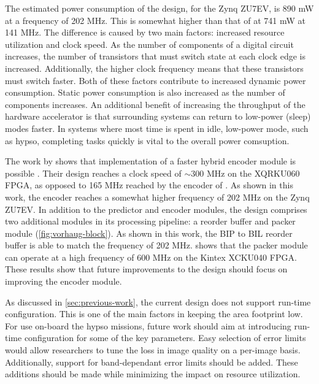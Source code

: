 The estimated power consumption of the design, for the Zynq ZU7EV, is 890 mW at a frequency of 202 MHz. This is somewhat higher than that of \citeauthor{vorhaugHyperspectralImageCompression2024} at 741 mW at 141 MHz. The difference is caused by two main factors: increased resource utilization and clock speed. As the number of components of a digital circuit increases, the number of transistors that must switch state at each clock edge is increased. Additionally, the higher clock frequency means that these transistors must switch faster. Both of these factors contribute to increased dynamic power consumption. Static power consumption is also increased as the number of components increases. An additional benefit of increasing the throughput of the hardware accelerator is that surrounding systems can return to low-power (sleep) modes faster. In systems where most time is spent in idle, low-power mode, such as \acrshort{hypso}, completing tasks quickly is vital to the overall power comsuption.

The work by \citeauthor{basconesRealTimeFPGAImplementation2022} shows that implementation of a faster hybrid encoder module is possible \cite{basconesRealTimeFPGAImplementation2022}. Their design reaches a clock speed of $\sim 300$ MHz on the XQRKU060 \acrshort{FPGA}, as opposed to 165 MHz reached by the encoder of \citeauthor{vorhaugHyperspectralImageCompression2024}. As shown in this work, the encoder reaches a somewhat higher frequency of 202 MHz on the Zynq ZU7EV. In addition to the predictor and encoder modules, the design comprises two additional modules in its processing pipeline: a reorder buffer and packer module (\autoref{fig:vorhaug-block}). As shown in this work, the \acrshort{BIP} to \acrshort{BIL} reorder buffer is able to match the frequency of 202 MHz. \citeauthor{vorhaugHyperspectralImageCompression2024} shows that the packer module can operate at a high frequency of 600 MHz on the Kintex XCKU040 \acrshort{FPGA}. These results show that future improvements to the design should focus on improving the encoder module.

As discussed in \autoref{sec:previous-work}, the current design does not support run-time configuration. This is one of the main factors in keeping the area footprint low. For use on-board the \acrshort{hypso} missions, future work should aim at introducing run-time configuration for some of the key parameters. Easy selection of error limits would allow researchers to tune the loss in image quality on a per-image basis. Additionally, support for band-dependant error limits should be added. These additions should be made while minimizing the impact on resource utilization.

